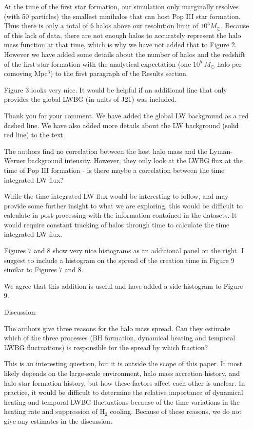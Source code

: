 \documentclass[11pt]{article}
\newenvironment{referee}[1][]{%
    \ignorespaces%
    \begin{mdframed}[style=myquotestyle,#1]%
}{%
    \end{mdframed}%
    \ignorespacesafterend%
}%
\begin{document}
At the time of the first star formation, our simulation only marginally resolves (with 50 particles) the smallest minihalos that can host Pop III star formation. Thus there is only a total of 6 halos above our resolution limit of $10^{5} M_{\odot}$. Because of this lack of data, there are not enough halos to accurately represent the halo mass function at that time, which is why we have not added that to Figure 2.  However we have added some details about the number of halos and the redshift of the first star formation with the analytical expectation (one $10^5~M_\odot$ halo per comoving Mpc$^3$) to the first paragraph of the Results section. 

\begin{referee}
Figure 3 looks very nice. It would be helpful if an additional line that only 
provides the global LWBG (in units of J21) was included.
\end{referee}
Thank you for your comment. We have added the global LW background as a red dashed line. We have also added more details about the LW background (solid red line) to the text.

\begin{referee}
The authors find no correlation between the host halo mass and the Lyman-Werner background intensity. However, they only look at the LWBG flux at the time of Pop III formation - is there maybe a correlation between the time integrated LW flux?
\end{referee}
While the time integrated LW flux would be interesting to follow, and may provide some further insight to what we are exploring, this would be difficult to calculate in post-processing with the information contained in the datasets. It would require constant tracking of halos through time to calculate the time integrated LW flux. 

\begin{referee}
Figures 7 and 8 show very nice histograms as an additional panel on the right.  I suggest to include a histogram on the spread of the creation time in Figure 9 similar to Figures 7 and 8.
\end{referee}
We agree that this addition is useful and have added a side histogram to Figure 9. 

\begin{referee}
Discussion:

The authors give three reasons for the halo mass spread. Can they estimate which of the three processes (BH formation, dynamical heating and temporal LWBG fluctuations) is responsible for the spread by which fraction?
\end{referee}
This is an interesting question, but it is outside the scope of this paper.  It most likely depends on the large-scale environment, halo mass accretion history, and halo star formation history, but how these factors affect each other is unclear.  In practice, it would be difficult to determine the relative importance of dynamical heating and temporal LWBG fluctuations because of the time variations in the heating rate and suppression of H$_2$ cooling.  Because of these reasons, we do not give any estimates in the discussion.
\end{document}
